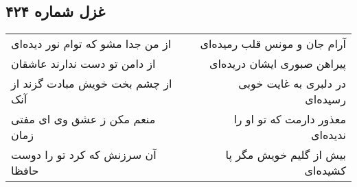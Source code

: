 \begin{center}
\section*{غزل شماره ۴۲۴}
\label{sec:sh424}
\begin{longtable}{l p{0.5cm} r}
از من جدا مشو که توام نور دیده‌ای
&&
آرام جان و مونس قلب رمیده‌ای
\\
از دامن تو دست ندارند عاشقان
&&
پیراهن صبوری ایشان دریده‌ای
\\
از چشم بخت خویش مبادت گزند از آنک
&&
در دلبری به غایت خوبی رسیده‌ای
\\
منعم مکن ز عشق وی ای مفتی زمان
&&
معذور دارمت که تو او را ندیده‌ای
\\
آن سرزنش که کرد تو را دوست حافظا
&&
بیش از گلیم خویش مگر پا کشیده‌ای
\\
\end{longtable}
\end{center}
